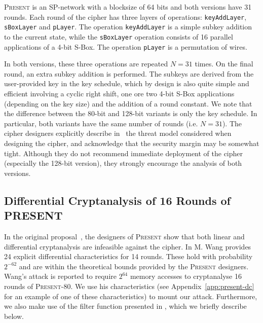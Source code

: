 \documentclass{llncs}
\newcommand{\PRESENT}{\textsc{Present}\xspace}
\begin{document}
\PRESENT is an SP-network with a blocksize of 64 bits and both versions have
31
rounds. Each round of the cipher has three layers of operations:
\texttt{keyAddLayer}, \texttt{sBoxLayer} and \texttt{pLayer}. The operation
\texttt{keyAddLayer} is a simple subkey addition to the
current state, while the \texttt{sBoxLayer} operation consists of 16 parallel
applications of a 4-bit S-Box.
The operation
\texttt{pLayer} is a permutation of wires.

In both versions, these three operations are repeated $N=31$ times. On the
final round, an extra subkey addition is performed. The subkeys are derived from
the user-provided key in the key schedule, which by design is also
quite simple and efficient involving a cyclic right shift, one ore two 4-bit
S-Box applications (depending on the key size) and the addition of a round
constant.
We note that the difference
between the 80-bit and 128-bit variants is only the key schedule. In particular,
both variants have the same number of rounds (i.e. $N=31$). The cipher
designers explicitly describe in~\cite{present} the threat model considered when
designing the cipher, and acknowledge that the security margin may be somewhat
tight. Although they do not recommend immediate deployment of the cipher
(especially the 128-bit version), they strongly encourage the analysis of both
versions.

\subsection{Differential Cryptanalysis of 16 Rounds of PRESENT}
\label{sec:present-dc}

In the original proposal~\cite{present}, the designers of \PRESENT show that
both linear and differential cryptanalysis are infeasible against the cipher. In
\cite{present-dc:africacrypt,present-differentials} M. Wang provides 24 explicit
differential characteristics for 14 rounds. These hold with
probability $2^{-62}$ and are within the theoretical bounds provided
by the \PRESENT designers. Wang's attack is reported to require
$2^{64}$ memory accesses to cryptanalyse 16 rounds of \PRESENT-80. We use his
characteristics (see Appendix~\ref{app:present-dc} for an example of one of
these
characteristics) to mount our attack. Furthermore, we also make use of the
filter function presented in \cite{present-dc:africacrypt}, which we briefly describe below.
\end{document}
